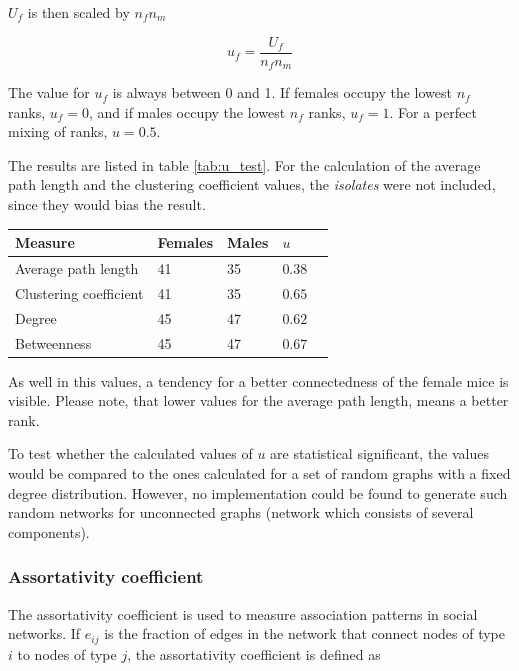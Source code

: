 $U_f$ is then scaled by $n_fn_m$

\begin{equation}
u_f = \frac{U_f}{n_fn_m}
\label{eq:mann_w_norm}
\end{equation}
 
The value for $u_f$ is always between 0 and 1. If females occupy the lowest $n_f$ ranks,  $u_f = 0$, and if males occupy the lowest $n_f$ ranks, $u_f=1$. For a perfect mixing of ranks, $u=0.5$.

The results are listed in table \ref{tab:u_test}. For the calculation of the average path length and the clustering coefficient values, the \textit{isolates} were not included, since they would bias the result.

\begin{center} 
\renewcommand\arraystretch{1.2}
\begin{tabular}{lllll}
\toprule
\textbf{Measure} &	\textbf{Females}	& \textbf{Males}	& \textbf{$u$} \\\midrule
Average path length	&	41	&	35	& $0.38$\\
Clustering coefficient	&	41	&	35	&  $0.65$ \\
Degree	&	45 	& 	47 	& $0.62$	\\
Betweenness	&	45	&	47	&	$0.67$ \\\bottomrule

\end{tabular}
\label{tab:u_test}
\end{center}

As well in this values, a tendency for a better connectedness of the female mice is visible. Please note, that lower values for the average path length, means a better rank.

To test whether the calculated values of $u$ are statistical significant, the values would be compared to the ones calculated for a set of random graphs with a fixed degree distribution\cite{croft:07}\cite{newman:02a}. However, no implementation could be found to generate such random networks for unconnected graphs (network which consists of several components).

\subsubsection{Assortativity coefficient}
\label{subsubsec:assortivity}     

The assortativity coefficient\cite{newman:03} is used to measure association patterns in social networks. If $e_{ij}$ is the fraction of edges in the network that connect nodes of type $i$ to nodes of type $j$, the assortativity coefficient is defined as

